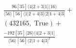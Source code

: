 \documentclass[varwidth, border=5pt]{standalone}
\begin{document}
\begin{my}
$\begin{gathered}
\scriptscriptstyle\frac{96[35]⟨4|2+3|1]⟨16⟩}{⟨56⟩[56]⟨1|2+4|3]⟨2|1+4|3]}+\\
\scriptscriptstyle(432165,\;\text{True})+\\
\scriptscriptstyle\frac{-192[35]⟨26⟩⟨4|2+3|1]}{⟨56⟩[56]⟨2|1+4|3]^2}\phantom{+}
\end{gathered}$
\end{my}
\end{document}
